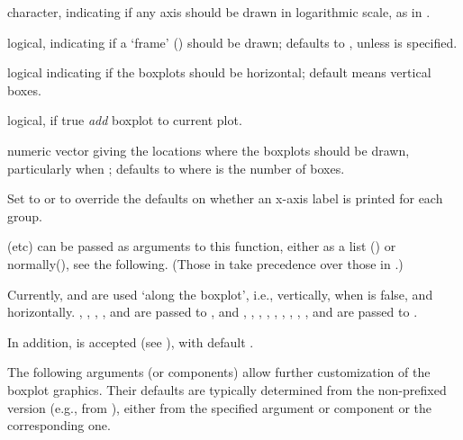 \begin{Arguments}
\begin{ldescription}
\item[\code{log}] character, indicating if any axis should be drawn in
logarithmic scale, as in .
\item[\code{frame.plot}] logical, indicating if a `frame'
() should be drawn; defaults to , unless
 is specified.
\item[\code{horizontal}] logical indicating if the  boxplots should be
horizontal; default  means vertical boxes.
\item[\code{add}] logical, if true \emph{add} boxplot to current plot.
\item[\code{at}] numeric vector giving the locations where the boxplots
should be drawn, particularly when ; defaults to
 where  is the number of boxes.
\item[\code{show.names}] Set to  or  to override the
defaults on whether an x-axis label is printed for each group.
\item[\code{pars,...}]  (etc) can be passed as
arguments to this function, either as a list () or
normally(), see the following.  (Those in 
take precedence over those in .)

Currently,  and  are used `along the
boxplot', i.e., vertically, when  is
false, and  horizontally.
, , , , and
 are passed to , and ,
, , , ,
, , , , and
 are passed to .

In addition,  is accepted (see
), with default .

The following arguments (or  components) allow further
customization of the boxplot graphics.  Their defaults are typically
determined from the non-prefixed version (e.g.,  from
), either from the specified argument or 
component or the corresponding  one.
\begin{description}


\end{description}
\end{ldescription}
\end{Arguments}
